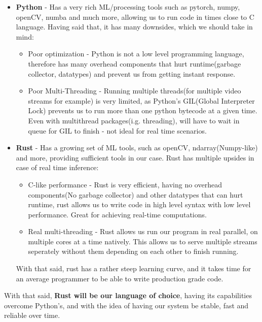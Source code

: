 \documentclass[
]{article}
\providecommand{\tightlist}{%
  \setlength{\itemsep}{0pt}\setlength{\parskip}{0pt}}
\begin{document}
\begin{itemize}
\tightlist
\item
  \textbf{Python} - Has a very rich ML/processing tools such as pytorch,
  numpy, openCV, numba and much more, allowing us to run code in times
  close to C language. Having said that, it has many downsides, which we
  should take in mind:

  \begin{itemize}
  \tightlist
  \item
    Poor optimization - Python is not a low level programming language,
    therefore has many overhead components that hurt runtime(garbage
    collector, datatypes) and prevent us from getting instant response.
  \item
    Poor Multi-Threading - Running multiple threads(for multiple video
    streams for example) is very limited, as Python's GIL(Global
    Interpreter Lock) prevents us to run more than one python bytecode
    at a given time. Even with multithread packages(i.g. threading),
    will have to wait in queue for GIL to finish - not ideal for real
    time scenarios.
  \end{itemize}
\item
  \textbf{Rust} - Has a growing set of ML tools, such as openCV,
  ndarray(Numpy-like) and more, providing sufficient tools in our case.
  Rust has multiple upsides in case of real time inference:

  \begin{itemize}
  \tightlist
  \item
    C-like performance - Rust is very efficient, having no overhead
    components(No garbage collector) and other datatypes that can hurt
    runtime, rust allows us to write code in high level syntax with low
    level performance. Great for achieving real-time computations.
  \item
    Real multi-threading - Rust allows us run our program in real
    parallel, on multiple cores at a time natively. This allows us to
    serve multiple streams seperately without them depending on each
    other to finish running.
  \end{itemize}

  With that said, rust has a rather steep learning curve, and it takes
  time for an average programmer to be able to write production grade
  code.
\end{itemize}

With that said, \textbf{Rust will be our language of choice}, having its
capabilities overcome Python's, and with the idea of having our system
be stable, fast and reliable over time.
\end{document}
